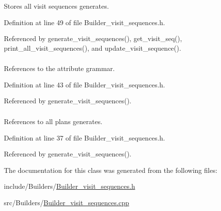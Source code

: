 Stores all visit sequences generates. 



Definition at line 49 of file Builder\_\-visit\_\-sequences.h.



Referenced by generate\_\-visit\_\-sequences(), get\_\-visit\_\-seq(), print\_\-all\_\-visit\_\-sequences(), and update\_\-visit\_\-sequence().

\hypertarget{classgenevalmag_1_1Builder__visit__sequences_a2eb7705741cd581ed968e0bc6127b3fd}{
\subsubsection[{attr\_\-grammar}]{}}
\label{classgenevalmag_1_1Builder__visit__sequences_a2eb7705741cd581ed968e0bc6127b3fd}


References to the attribute grammar. 



Definition at line 43 of file Builder\_\-visit\_\-sequences.h.



Referenced by generate\_\-visit\_\-sequences().

\hypertarget{classgenevalmag_1_1Builder__visit__sequences_accdb8c83f0540acd32f2ee461c9b2fbe}{
\subsubsection[{b\_\-plans}]{}}
\label{classgenevalmag_1_1Builder__visit__sequences_accdb8c83f0540acd32f2ee461c9b2fbe}


References to all plans generates. 



Definition at line 37 of file Builder\_\-visit\_\-sequences.h.



Referenced by generate\_\-visit\_\-sequences().



The documentation for this class was generated from the following files:\begin{DoxyCompactItemize}
\item 
include/Builders/\hyperlink{Builder__visit__sequences_8h}{Builder\_\-visit\_\-sequences.h}\item 
src/Builders/\hyperlink{Builder__visit__sequences_8cpp}{Builder\_\-visit\_\-sequences.cpp}\end{DoxyCompactItemize}
